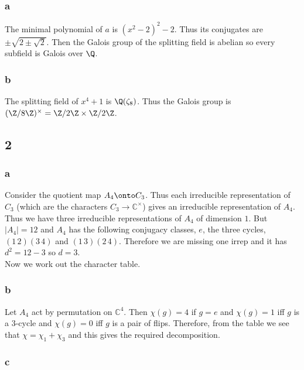 \documentclass[12pt]{article}
\renewcommand{\C}{\mathbb{C}}
\begin{document}
\subsubsection{a}

The minimal polynomial of $a$ is $(x^2 - 2)^2 - 2$. Thus its conjugates are $\pm \sqrt{2 \pm \sqrt{2}}$. Then the Galois group of the splitting field is abelian so every subfield is Galois over $\Q$.

\subsubsection{b}

The splitting field of $x^4 + 1$ is $\Q(\zeta_8)$. Thus the Galois group is $(\Z / 8 \Z)^\times = \Z / 2 \Z \times \Z / 2 \Z$. 

\subsection{2}

\subsubsection{a}

Consider the quotient map $A_4 \onto C_3$. Thus each irreducible representation of $C_3$ (which are the characters $C_3 \to \C^\times$) gives an irreducible representation of $A_4$. Thus we have three irreducible representations of $A_4$ of dimension $1$. But $|A_4| = 12$ and $A_4$ has the following conjugacy classes, $e$, the three cycles, $(1 \, 2)(3 \, 4)$ and $(1 \, 3)(2 \, 4)$. Therefore we are missing one irrep and it has $d^2 = 12 - 3$ so $d = 3$. 
\bigskip\\
Now we work out the character table. 

\subsubsection{b}

Let $A_4$ act by permutation on $\C^4$. Then $\chi(g) = 4$ if $g = e$ and $\chi(g) = 1$ iff $g$ is a $3$-cycle and $\chi(g) = 0$ iff $g$ is a pair of flips. Therefore, from the table we see that $\chi = \chi_1 + \chi_3$ and this gives the required decomposition.

\subsubsection{c}
\end{document}
